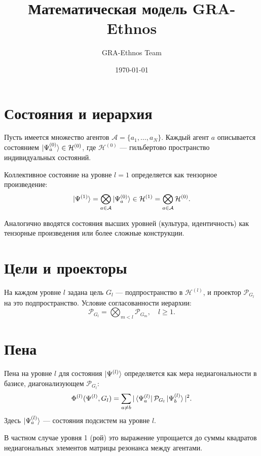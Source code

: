 \documentclass{article}
\title{Математическая модель GRA-Ethnos}
\author{GRA-Ethnos Team}
\date{\today}
\begin{document}
\maketitle

\section{Состояния и иерархия}

Пусть имеется множество агентов $\mathcal{A} = \{a_1,\dots,a_N\}$. Каждый агент $a$ описывается состоянием $\ket{\Psi_a^{(0)}} \in \mathcal{H}^{(0)}$, где $\mathcal{H}^{(0)}$ — гильбертово пространство индивидуальных состояний.

Коллективное состояние на уровне $l=1$ определяется как тензорное произведение:
\begin{equation}
\ket{\Psi^{(1)}} = \bigotimes_{a \in \mathcal{A}} \ket{\Psi_a^{(0)}} \in \mathcal{H}^{(1)} = \bigotimes_{a \in \mathcal{A}} \mathcal{H}^{(0)}.
\end{equation}

Аналогично вводятся состояния высших уровней (культура, идентичность) как тензорные произведения или более сложные конструкции.

\section{Цели и проекторы}

На каждом уровне $l$ задана цель $G_l$ — подпространство в $\mathcal{H}^{(l)}$, и проектор $\mathcal{P}_{G_l}$ на это подпространство. Условие согласованности иерархии:
\begin{equation}
\mathcal{P}_{G_l} = \bigotimes_{m<l} \mathcal{P}_{G_m}, \quad l\ge 1.
\end{equation}

\section{Пена}

Пена на уровне $l$ для состояния $\ket{\Psi^{(l)}}$ определяется как мера недиагональности в базисе, диагонализующем $\mathcal{P}_{G_l}$:
\begin{equation}
\Phi^{(l)}(\Psi^{(l)}, G_l) = \sum_{a \neq b} |\bra{\Psi_a^{(l)}} \mathcal{P}_{G_l} \ket{\Psi_b^{(l)}}|^2.
\end{equation}
Здесь $\ket{\Psi_a^{(l)}}$ — состояния подсистем на уровне $l$.

В частном случае уровня 1 (рой) это выражение упрощается до суммы квадратов недиагональных элементов матрицы резонанса между агентами.
\end{document}
